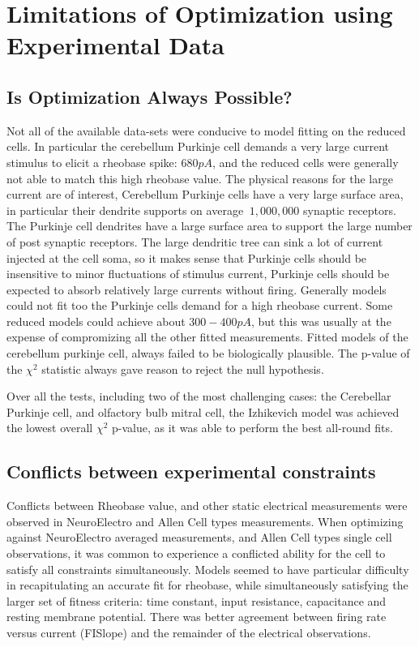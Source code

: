 
\section{Limitations of Optimization using Experimental Data}
\label{sec:limitations-of-optimization}

\subsection{Is Optimization Always Possible?}
Not all of the available data-sets were conducive to model fitting on the reduced cells. In particular the cerebellum Purkinje cell demands a very large current stimulus to elicit a rheobase spike: $680pA$, and the reduced cells were generally not able to match this high rheobase value. The physical reasons for the large current are of interest, Cerebellum Purkinje cells have a very large surface area, in particular their dendrite supports on average $~1,000,000 $ synaptic receptors. The Purkinje cell dendrites have a large surface area to support the large number of post synaptic receptors. The large dendritic tree can sink a lot of current injected at the cell soma, so it makes sense that Purkinje cells should be insensitive to minor fluctuations of stimulus current, Purkinje cells should be expected to absorb relatively large currents without firing. Generally models could not fit too the Purkinje cells demand for a high rheobase current. Some reduced models could achieve about $300-400pA$, but this was usually at the expense of compromizing all the other fitted measurements. Fitted models of the cerebellum purkinje cell, always failed to be biologically plausible. The p-value of the $\chi^{2}$ statistic always gave reason to reject the null hypothesis.

Over all the tests, including two of the most challenging cases: the Cerebellar Purkinje cell, and olfactory bulb mitral cell, the Izhikevich model was achieved the lowest overall $\chi^{2}$ p-value, as it was able to perform the best all-round fits. %

\subsection{Conflicts between experimental constraints}
Conflicts between Rheobase value, and other static electrical measurements were observed in NeuroElectro and Allen Cell types measurements. When optimizing against NeuroElectro averaged measurements, and Allen Cell types single cell observations, it was common to experience a conflicted ability for the cell to satisfy all constraints simultaneously. 
Models seemed to have particular difficulty in recapitulating an accurate fit for rheobase, while simultaneously satisfying the larger set of fitness criteria: time constant, input resistance, capacitance and resting membrane potential. There was better agreement between firing rate versus current (FISlope) and the remainder of the electrical observations.


